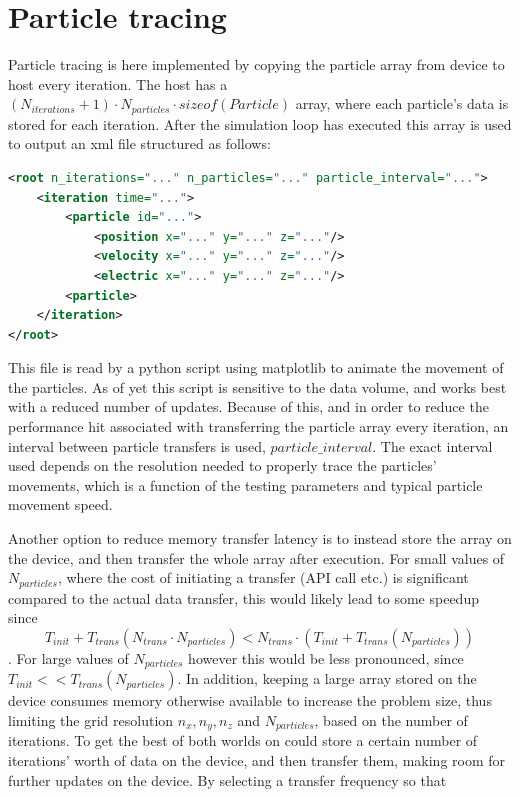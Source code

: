 \section{Particle tracing}\label{sec:implementation-tracing}
Particle tracing is here implemented by copying the particle array from device to host every iteration. The host has a
$(N_{iterations}+1) \cdot N_{particles} \cdot sizeof(Particle)$ array, where each particle's data is stored for each
iteration. After the simulation loop has executed this array is used to output an xml file structured as follows:
\begin{lstlisting}[language=xml]
<root n_iterations="..." n_particles="..." particle_interval="...">
	<iteration time="...">
		<particle id="...">
			<position x="..." y="..." z="..."/>
			<velocity x="..." y="..." z="..."/>
			<electric x="..." y="..." z="..."/>
		<particle>
	</iteration>
</root>
\end{lstlisting}
This file is read by a python script using matplotlib to animate the movement of the particles. As of yet this script is
sensitive to the data volume, and works best with a reduced number of updates. Because of this, and in order to reduce
the performance hit associated with transferring the particle array every iteration, an interval between particle
transfers is used, $particle\_interval$. The exact interval used depends on the resolution needed to properly trace the
particles' movements, which is a function of the testing parameters and typical particle movement speed.

Another option to reduce memory transfer latency is to instead store the array on the device, and then transfer the
whole array after execution. For small values of $N_{particles}$, where the cost of initiating a transfer (API call etc.)
is significant compared to the actual data transfer, this would likely lead to some speedup since
$$T_{init} + T_{trans}(N_{trans} \cdot N_{particles}) <N_{trans} \cdot \left(T_{init} + T_{trans}(N_{particles})\right)$$.
For large values of $N_{particles}$ however this would be less pronounced, since $T_{init} << T_{trans}(N_{particles})$.
In addition, keeping a large array stored on the device consumes memory otherwise available to increase the problem size,
thus limiting the grid resolution $n_x, n_y, n_z$ and $N_{particles}$, based on the number of iterations. To get the
best of both worlds on could store a certain number of iterations' worth of data on the device, and then transfer them,
making room for further updates on the device. By selecting a transfer frequency so that 

